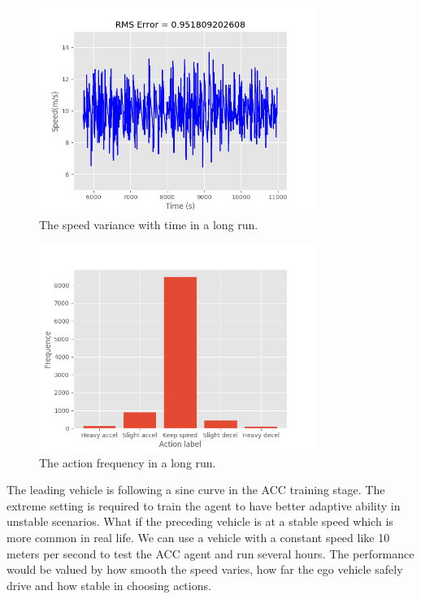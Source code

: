 \begin{figure}[h]
\centering
\includegraphics[width=0.8\textwidth]{figs/ch5/long_speed_variance}
\caption{The speed variance with time in a long run.}
\label{fig:long_speed_variance}
\end{figure}

\begin{figure}[h]
\centering
\includegraphics[width=0.8\textwidth]{figs/ch5/long_travel_action}
\caption{The action frequency in a long run.}
\label{fig:long_travel_action}
\end{figure}

The leading vehicle is following a sine curve in the ACC training stage. The extreme setting is required to train the agent to have better adaptive ability in unstable scenarios. What if the preceding vehicle is at a stable speed which is more common in real life. We can use a vehicle with a constant speed like 10 meters per second to test the ACC agent and run several hours. The performance would be valued by how smooth the speed varies, how far the ego vehicle safely drive and how stable in choosing actions.

